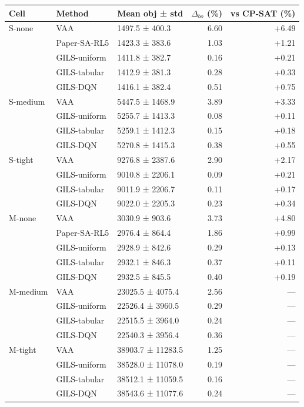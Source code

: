 \documentclass[
]{article}
\newcounter{none} %
\begin{document}
{\def\LTcaptype{none} %
\begin{longtable}[]{@{}lllrr@{}}
\toprule\noalign{}
Cell & Method & Mean obj ± std & \(\Delta_{bo}\) (\%) & vs CP-SAT
(\%) \\
\midrule\noalign{}
\endhead
\bottomrule\noalign{}
\endlastfoot
S-none & VAA & 1497.5 ± 400.3 & 6.60 & +6.49 \\
& Paper-SA-RL5 & 1423.3 ± 383.6 & 1.03 & +1.21 \\
& GILS-uniform & 1411.8 ± 382.7 & 0.16 & +0.21 \\
& GILS-tabular & 1412.9 ± 381.3 & 0.28 & +0.33 \\
& GILS-DQN & 1416.1 ± 382.4 & 0.51 & +0.75 \\
S-medium & VAA & 5447.5 ± 1468.9 & 3.89 & +3.33 \\
& GILS-uniform & 5255.7 ± 1413.3 & 0.08 & +0.11 \\
& GILS-tabular & 5259.1 ± 1412.3 & 0.15 & +0.18 \\
& GILS-DQN & 5270.8 ± 1415.3 & 0.38 & +0.55 \\
S-tight & VAA & 9276.8 ± 2387.6 & 2.90 & +2.17 \\
& GILS-uniform & 9010.8 ± 2206.1 & 0.09 & +0.21 \\
& GILS-tabular & 9011.9 ± 2206.7 & 0.11 & +0.17 \\
& GILS-DQN & 9022.0 ± 2205.3 & 0.23 & +0.34 \\
M-none & VAA & 3030.9 ± 903.6 & 3.73 & +4.80 \\
& Paper-SA-RL5 & 2976.4 ± 864.4 & 1.86 & +0.99 \\
& GILS-uniform & 2928.9 ± 842.6 & 0.29 & +0.13 \\
& GILS-tabular & 2932.1 ± 846.3 & 0.37 & +0.11 \\
& GILS-DQN & 2932.5 ± 845.5 & 0.40 & +0.19 \\
M-medium & VAA & 23025.5 ± 4075.4 & 2.56 & --- \\
& GILS-uniform & 22526.4 ± 3960.5 & 0.29 & --- \\
& GILS-tabular & 22515.5 ± 3964.0 & 0.24 & --- \\
& GILS-DQN & 22540.3 ± 3956.4 & 0.36 & --- \\
M-tight & VAA & 38903.7 ± 11283.5 & 1.25 & --- \\
& GILS-uniform & 38528.0 ± 11078.0 & 0.19 & --- \\
& GILS-tabular & 38512.1 ± 11059.5 & 0.16 & --- \\
& GILS-DQN & 38543.6 ± 11077.6 & 0.24 & --- \\

\end{longtable}}
\end{document}
